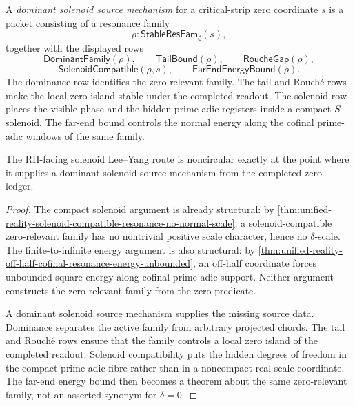 \begin{definition}
\label{def:unified-reality-dominant-solenoid-source-mechanism}
A \emph{dominant solenoid source mechanism} for a critical-strip zero
coordinate $s$ is a packet consisting of a resonance family
$$
\rho:\mathsf{StableResFam}_{\zeta}(s),
$$
together with the displayed rows
$$
\mathsf{DominantFamily}(\rho),
\qquad
\mathsf{TailBound}(\rho),
\qquad
\mathsf{RoucheGap}(\rho),
$$
$$
\mathsf{SolenoidCompatible}(\rho,s),
\qquad
\mathsf{FarEndEnergyBound}(\rho).
$$
The dominance row identifies the zero-relevant family.  The tail and
Rouch\'e rows make the local zero island stable under the completed
readout.  The solenoid row places the visible phase and the hidden
prime-adic registers inside a compact $S$-solenoid.  The far-end bound
controls the normal energy along the cofinal prime-adic windows of the
same family.
\end{definition}

\begin{theorem}
\label{thm:unified-reality-source-mechanisms-are-noncircular-content}
The RH-facing solenoid Lee--Yang route is noncircular exactly at the
point where it supplies a dominant solenoid source mechanism from the
completed zero ledger.
\end{theorem}

\begin{proof}
The compact solenoid argument is already structural: by
\autoref{thm:unified-reality-solenoid-compatible-resonance-no-normal-scale},
a solenoid-compatible zero-relevant family has no nontrivial positive
scale character, hence no $\delta$-scale.  The finite-to-infinite energy
argument is also structural: by
\autoref{thm:unified-reality-off-half-cofinal-resonance-energy-unbounded},
an off-half coordinate forces unbounded square energy along cofinal
prime-adic support.  Neither argument constructs the zero-relevant
family from the zero predicate.

A dominant solenoid source mechanism supplies the missing source data.
Dominance separates the active family from arbitrary projected chords.
The tail and Rouch\'e rows ensure that the family controls a local zero
island of the completed readout.  Solenoid compatibility puts the hidden
degrees of freedom in the compact prime-adic fibre rather than in a
noncompact real scale coordinate.  The far-end energy bound then becomes
a theorem about the same zero-relevant family, not an asserted synonym
for $\delta=0$.
\end{proof}

